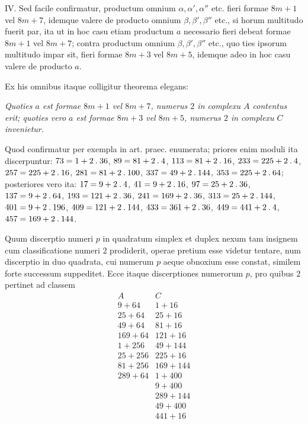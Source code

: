 IV. Sed facile confirmatur, productum omnium $\alpha,\alpha',\alpha''$ etc. fieri formae $8m+1$ vel $8m+7$, idemque valere de producto omnium $\beta,\beta',\beta''$ etc., si horum multitudo fuerit par, ita ut in hoc casu etiam productum $a$ necessario fieri debeat formae $8m+1$ vel $8m+7$; contra productum omnium $\beta,\beta',\beta''$ etc., quo%
%
ties ipsorum multitudo impar sit, fieri formae $8m+3$ vel $8m+5$, idemque adeo in hoc casu valere de producto $a$.

Ex his omnibus itaque colligitur theorema elegans:

\emph{Quoties $a$ est formae $8m+1$ vel $8m+7$, numerus $2$ in complexu $A$ contentus erit; quoties vero $a$ est formae $8m+3$ vel $8m+5$, numerus $2$ in complexu $C$ invenietur.}

Quod confirmatur per exempla in art. praec. enumerata; priores enim moduli ita discerpuntur: $73=1+2\mathbin{.}36$, $89=81+2\mathbin{.}4$, $113=81+2\mathbin{.}16$, $233=225+2\mathbin{.}4$, $257=225+2\mathbin{.}16$, $281=81+2\mathbin{.}100$, $337=49+2\mathbin{.}144$, $353=225+2\mathbin{.}64$; posteriores vero ita: $17=9+2\mathbin{.}4$, $41=9+2\mathbin{.}16$, $97=25+2\mathbin{.}36$, $137=9+2\mathbin{.}64$, $193=121+2\mathbin{.}36$, $241=169+2\mathbin{.}36$, $313=25+2\mathbin{.}144$, $401=9+2\mathbin{.}196$, $409=121+2\mathbin{.}144$, $433=361+2\mathbin{.}36$, $449=441+2\mathbin{.}4$, $457=169+2\mathbin{.}144$.

Quum discerptio numeri $p$ in quadratum simplex et duplex nexum tam insignem cum classificatione numeri $2$ prodiderit, operae pretium esse videtur tentare, num discerptio in duo quadrata, cui numerum $p$ aeque obnoxium esse constat, similem forte successum suppeditet. Ecce itaque discerptiones numerorum $p$, pro quibus $2$ pertinet ad classem
\[
\begin{array}{c|c}
A&C\\\hline
9+64&1+16\\
25+64&25+16\\
49+64&81+16\\
169+64&121+16\\
1+256&49+144\\
25+256&225+16\\
81+256&169+144\\
289+64&1+400\\
&9+400\\
&289+144\\
&49+400\\
&441+16
\end{array}
\]

